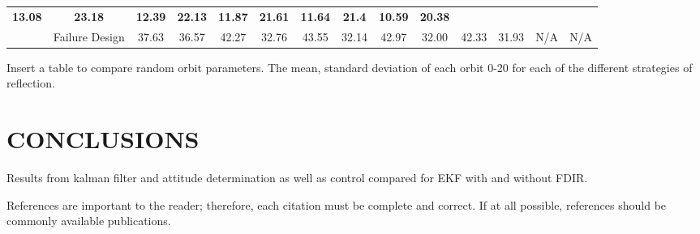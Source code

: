\documentclass[letterpaper, 10 pt, conference]{ieeeconf}  %
\begin{document}
\begin{table*}[]
\begin{tabular}{@{}llcccccccccccc@{}}
	\multicolumn{1}{c|}{\textbf{13.08}} &
	\multicolumn{1}{c|}{\textbf{23.18}} &
	\multicolumn{1}{c|}{\textbf{12.39}} &
	\multicolumn{1}{c|}{\textbf{22.13}} &
	\multicolumn{1}{c|}{\textbf{11.87}} &
	\multicolumn{1}{c|}{\textbf{21.61}} &
	\multicolumn{1}{c|}{\textbf{11.64}} &
	\multicolumn{1}{c|}{\textbf{21.4}} &
	\multicolumn{1}{c|}{\textbf{10.59}} &
	\multicolumn{1}{c|}{\textbf{20.38}} \\ \cmidrule(l){2-14} 
	\multicolumn{1}{|l|}{} &
	\multicolumn{1}{l|}{Failure Design} &
	\multicolumn{1}{c|}{37.63} &
	\multicolumn{1}{c|}{36.57} &
	\multicolumn{1}{c|}{42.27} &
	\multicolumn{1}{c|}{32.76} &
	\multicolumn{1}{c|}{43.55} &
	\multicolumn{1}{c|}{32.14} &
	\multicolumn{1}{c|}{42.97} &
	\multicolumn{1}{c|}{32.00} &
	\multicolumn{1}{c|}{42.33} &
	\multicolumn{1}{c|}{31.93} &
	\multicolumn{1}{c|}{N/A} &
	\multicolumn{1}{c|}{N/A} \\ \bottomrule
\end{tabular}
\end{table*}
\newpage

Insert a table to compare random orbit parameters. The mean, standard deviation of each orbit 0-20 for each of the different strategies of reflection.

\section{CONCLUSIONS}
Results from kalman filter and attitude determination as well as control compared for EKF with and without FDIR.

\addtolength{\textheight}{-12cm}   %





References are important to the reader; therefore, each citation must be complete and correct. If at all possible, references should be commonly available publications.
\end{document}
